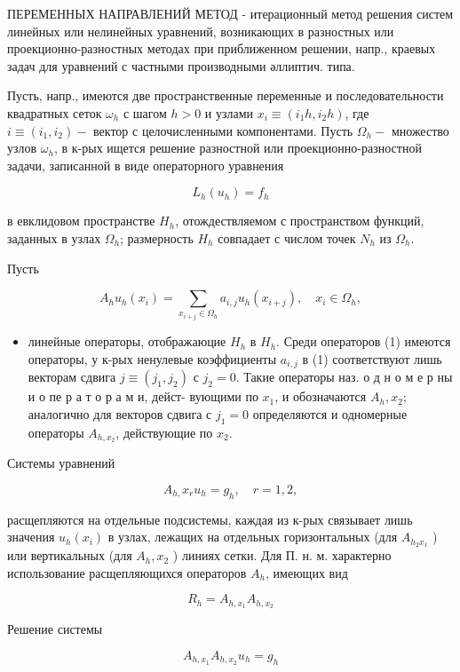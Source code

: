 \documentclass[10pt]{article}
\begin{document}
ПЕРЕМЕННЫХ НАПРАВЛЕНИЙ МЕТОД - итерационный метод решения систем линейных или нелинейных уравнений, возникающих в разностных или проекционно-разностных методах при приближенном решении, напр., краевых задач для уравнений с частными производными әллиптич. типа.

Пусть, напр., имеются две пространственные переменные и последовательности квадратных сеток $\omega_{h}$ с шагом $h>0$ и узлами $x_{i} \equiv\left(i_{1} h, i_{2} h\right)$, где $i \equiv\left(i_{1}, i_{2}\right)-$ вектор с целочисленными компонентами. Пусть $\Omega_{h}-$ множество узлов $\omega_{h}$, в к-рых ищется решение разностной или проекционно-разностной задачи, записанной в виде операторного уравнения

\[
L_{h}\left(u_{h}\right)=f_{h}
\]

в евклидовом пространстве $H_{h}$, отождествляемом с пространством функций, заданных в узлах $\Omega_{h}$; размерность $H_{h}$ совпадает с числом точек $N_{h}$ из $\Omega_{h}$.

Пусть

\[
A_{h} u_{h}\left(x_{i}\right)=\sum_{x_{i+j} \in \Omega_{h}} a_{i, j} u_{h}\left(x_{i+j}\right), \quad x_{i} \in \Omega_{h},
\]

\begin{itemize}
  \item линейные операторы, отображаюцие $H_{h}$ в $H_{h}$. Среди операторов (1) имеются операторы, у к-рых ненулевые коэффициенты $a_{i, j}$ в (1) соответствуют лишь векторам сдвига $j \equiv\left(j_{1}, j_{2}\right)$ с $j_{2}=0$. Такие операторы наз. о д н о м е р ны и о пе р а т о р а м и, дейст- вующими по $x_{1}$, и обозначаются $A_{h}, x_{2} ;$ аналогично для векторов сдвига с $j_{1}=0$ определяются и одномерные операторы $A_{h, x_{2}}$, действующие по $x_{2}$.
\end{itemize}

Системы уравнений

\[
A_{h,} x_{r} u_{h}=g_{h}, \quad r=1,2,
\]

расщепляются на отдельные подсистемы, каждая из к-рых связывает лишь значения $u_{h}\left(x_{i}\right)$ в узлах, лежащих на отдельных горизонтальных (для $A_{h_{2} x_{1}}$ ) или вертикальных (для $A_{h}, x_{2}$ ) линиях сетки. Для П. н. м. характерно использование расщепляющихся операторов $A_{h}$, имеющих вид

\[
R_{h}=A_{h, x_{1}} A_{h, x_{2}}
\]

Решение системы

\[
A_{h, x_{1}} A_{h, x_{2}} u_{h}=g_{h}
\]
\end{document}
